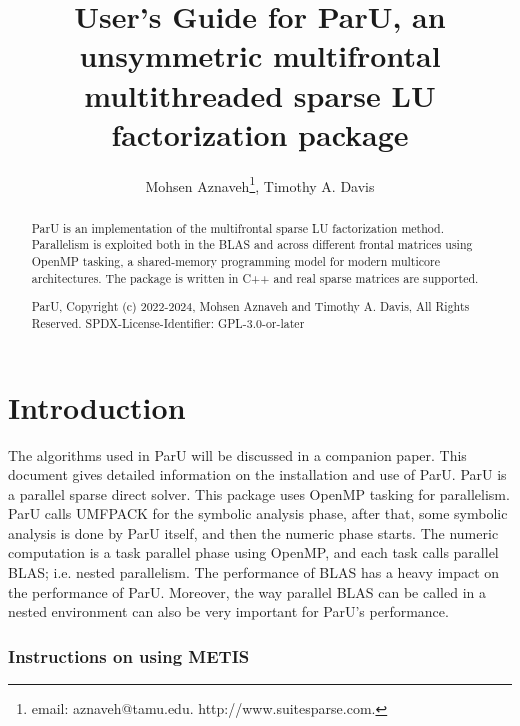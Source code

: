 \documentclass[12pt]{article}
\title{User's Guide for ParU, an unsymmetric multifrontal multithreaded sparse
LU factorization package}
\author{Mohsen Aznaveh\thanks{
email: aznaveh@tamu.edu.
http://www.suitesparse.com.
},
Timothy A. Davis}
\begin{document}
\maketitle

\begin{abstract}

ParU is an implementation of the multifrontal sparse LU factorization
method.  Parallelism is exploited both in the BLAS and across different frontal
matrices using OpenMP tasking, a shared-memory programming model for modern 
multicore architectures. The package is written in C++ and real sparse matrices 
are supported.

ParU, Copyright (c) 2022-2024, Mohsen Aznaveh and Timothy A. Davis,
All Rights Reserved.
SPDX-License-Identifier: GPL-3.0-or-later
\end{abstract}

\maketitle

\section{Introduction}
\label{intro}

The algorithms used in ParU will be discussed in a companion paper.
This document gives detailed information on the installation
and use of ParU.
ParU is a parallel sparse direct solver. This package uses OpenMP
tasking for parallelism. ParU calls UMFPACK for the symbolic analysis phase,
after that, some symbolic analysis is done by ParU itself, and  then the numeric
phase starts. The numeric computation is a task parallel phase using OpenMP, 
and each task calls parallel BLAS; i.e. nested parallelism. 
The performance of BLAS has a heavy impact on the performance of ParU. Moreover,
the way parallel BLAS can be called in a nested environment can also be very
important for ParU's performance.


\subsubsection{Instructions on using METIS}
\end{document}
